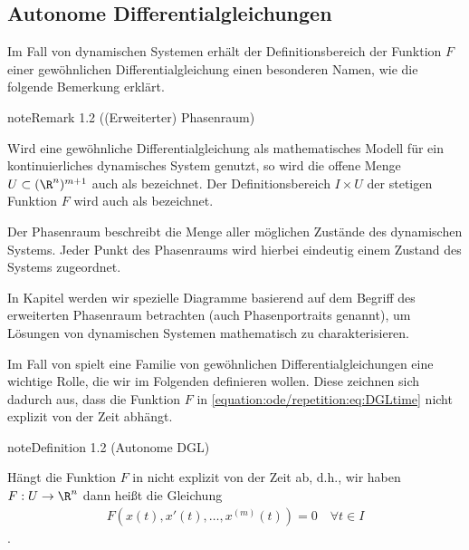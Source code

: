 \documentclass[letterpaper,10pt,german]{jupyterBook}
\begin{document}
\subsection{Autonome Differentialgleichungen}
\label{\detokenize{ode/repetition:autonome-differentialgleichungen}}
\sphinxAtStartPar
Im Fall von dynamischen Systemen erhält der Definitionsbereich der Funktion \(F\) einer gewöhnlichen Differentialgleichung einen besonderen Namen, wie die folgende Bemerkung erklärt.
\label{ode/repetition:remark-2}
\begin{sphinxadmonition}{note}{Remark 1.2 ((Erweiterter) Phasenraum)}



\sphinxAtStartPar
Wird eine gewöhnliche Differentialgleichung als mathematisches Modell für ein kontinuierliches dynamisches System genutzt, so wird die offene Menge \(U\subset (\R^n)^{m+1}\) auch als  bezeichnet.
Der Definitionsbereich \(I\times U\) der stetigen Funktion \(F\) wird auch als  bezeichnet.

\sphinxAtStartPar
Der Phasenraum beschreibt die Menge aller möglichen Zustände des dynamischen Systems.
Jeder Punkt des Phasenraums wird hierbei eindeutig einem Zustand des Systems zugeordnet.

\sphinxAtStartPar
In Kapitel {\hyperref[\detokenize{ode/fluesse:s-fluesse}]{}} werden wir spezielle Diagramme basierend auf dem Begriff des erweiterten Phasenraum betrachten (auch Phasenportraits genannt), um Lösungen von dynamischen Systemen mathematisch zu charakterisieren.
\end{sphinxadmonition}

\sphinxAtStartPar
Im Fall von  spielt eine Familie von gewöhnlichen Differentialgleichungen eine wichtige Rolle, die wir im Folgenden definieren wollen.
Diese zeichnen sich dadurch aus, dass die Funktion \(F\) in \eqref{equation:ode/repetition:eq:DGLtime} nicht explizit von der Zeit abhängt.
\label{ode/repetition:definition-3}
\begin{sphinxadmonition}{note}{Definition 1.2 (Autonome DGL)}



\sphinxAtStartPar
Hängt die Funktion \(F\) in {\hyperref[\detokenize{ode/repetition:def:DGL}]{}} nicht explizit von der Zeit ab, d.h., wir haben \(F:U\rightarrow\R^n\) dann heißt die Gleichung
\begin{equation}\label{equation:ode/repetition:eq:autonomeDGL}
\begin{split}F(x(t), x'(t), \ldots, x^{(m)}(t)) = 0 \quad \forall t\in I\end{split}
\end{equation}
\sphinxAtStartPar
{}.
\end{sphinxadmonition}
\end{document}
